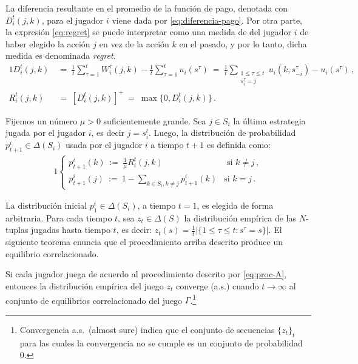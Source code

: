 La diferencia resultante en el promedio de la función de pago, denotada con $D_i^t(j, k)$, para el jugador $i$ viene dada por \eqref{eq:diferencia-pago}. Por otra parte, la expresión \eqref{eq:regret} se puede interpretar como una medida de  del jugador $i$ de haber elegido la acción $j$ en vez de la acción $k$ en el pasado, y por lo tanto, dicha medida es denominada \textit{regret}.
\begin{alignat}{1}
\label{eq:diferencia-pago}
  D_i^t(j, k)\ 
    &=\ \frac{1}{t} \sum_{\tau = 1}^{t} W_i^{\tau}(j, k) - \frac{1}{t} \sum_{\tau = 1}^{t} u_i(s^{\tau})\ 
	=\ \frac{1}{t} \sum_{\substack{1\leq \tau \leq t \\s^\tau_i = j}} u_i(k, s_{-i}^{\tau}) - u_i(s^{\tau})\,, \\
\label{eq:regret}
R_i^t(j, k)\ &=\ [D_i^t(j, k)]^+\ =\ \max\{0, D_i^t(j, k)\} \,.
\end{alignat}

Fijemos un número $\mu > 0$ suficientemente grande. Sea $j \in S_i$ la última estrategia jugada por el jugador $i$, es decir $j = s_i^t$. Luego, la distribución de probabilidad $p_{t+1}^i \in \Delta(S_i)$ usada por el jugador $i$ a tiempo $t+1$ es definida como:
\begin{alignat}{1}
\label{eq:proc-A}
  \begin{cases}
    p_{t+1}^i(k)\ :=\  \frac{1}{\mu} R_i^t(j, k) & \text{ si $k \neq j$} \,, \\
    p_{t+1}^i(j)\ :=\ 1 - \sum_{k \in S_i, k \neq j} p_{t+1}^i(k) & \text{si $k=j$} \,.
  \end{cases}
\end{alignat}

La distribución inicial $p_{1}^i \in \Delta(S_i)$, a tiempo $t=1$, es elegida de forma arbitraria. Para cada tiempo $t$, sea $z_t \in \Delta(S)$ la distribución empírica de las $N$-tuplas jugadas hasta tiempo $t$, es decir:
$z_t(s) = \frac{1}{t} |\{1\leq\tau \leq t : s^{\tau} = s \}|$. El siguiente teorema enuncia que el procedimiento arriba descrito produce un equilibrio correlacionado.

\begin{theorem}
\label{theo:conv-proc-A}
Si cada jugador juega de acuerdo al procedimiento descrito por \eqref{eq:proc-A}, entonces la distribución empírica del juego $z_t$ converge (a.s.) cuando $t \rightarrow \infty$ al conjunto de equilibrios correlacionado del juego $\Gamma$.\footnote{Convergencia a.s.\ (almost sure) indica que el conjunto de  secuencias $\{z_t\}_t$ para las cuales la convergencia no se cumple es un conjunto de probabilidad 0.}
\end{theorem}

